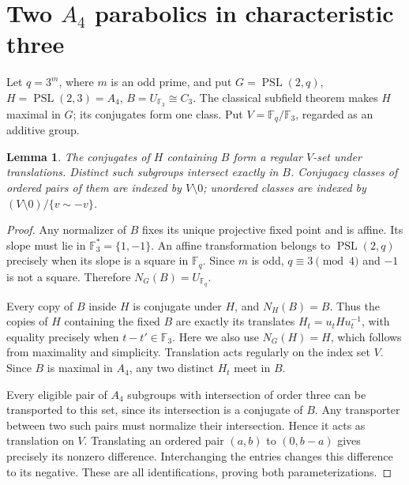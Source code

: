 \documentclass[11pt]{article}
\newtheorem{lemma}[theorem]{Lemma}
\newcommand{\F}{\mathbb F}
\newcommand{\PSL}{\operatorname{PSL}}
\begin{document}
\section{Two $A_4$ parabolics in characteristic three}
Let $q=3^m$, where $m$ is an odd prime, and put
$G=\PSL(2,q)$, $H=\PSL(2,3)=A_4$, $B=U_{\F_3}\cong C_3$.
The classical subfield theorem makes $H$ maximal in $G$; its conjugates
form one class. Put $V=\F_q/\F_3$, regarded as an additive group.

\begin{lemma}\label{torsor}
The conjugates of $H$ containing $B$ form a regular $V$-set under
translations. Distinct such subgroups intersect exactly in $B$.
Conjugacy classes of ordered pairs of them are indexed by $V\setminus0$;
unordered classes are indexed by $(V\setminus0)/\{v\sim-v\}$.
\end{lemma}
\begin{proof}
Any normalizer of $B$ fixes its unique projective fixed point and is
affine. Its slope must lie in $\F_3^*=\{1,-1\}$. An affine
transformation belongs to $\PSL(2,q)$ precisely when its slope is a
square in $\F_q$. Since $m$ is odd, $q\equiv3\pmod4$ and $-1$
is not a square. Therefore $N_G(B)=U_{\F_q}$.

Every copy of $B$ inside $H$ is conjugate under $H$, and $N_H(B)=B$.
Thus the copies of $H$ containing the fixed $B$ are exactly its
translates $H_t=u_t H u_t^{-1}$, with equality precisely when
$t-t'\in\F_3$. Here we also use $N_G(H)=H$, which follows from
maximality and simplicity. Translation acts regularly on the index set
$V$. Since $B$ is maximal in $A_4$, any two distinct $H_t$ meet in
$B$.

Every eligible pair of $A_4$ subgroups with intersection of order three
can be transported to this set, since its intersection is a conjugate of
$B$. Any transporter between two such pairs must normalize their
intersection. Hence it acts as translation on $V$. Translating an
ordered pair $(a,b)$ to $(0,b-a)$ gives precisely its nonzero difference.
Interchanging the entries changes this difference to its negative.
These are all identifications, proving both parameterizations.
\end{proof}
\end{document}

